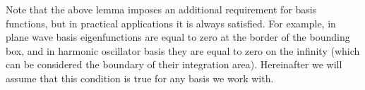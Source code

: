 Note that the above lemma imposes an additional requirement for basis functions, but in practical applications it is always satisfied.
For example, in plane wave basis eigenfunctions are equal to zero at the border of the bounding box, and in harmonic oscillator basis they are equal to zero on the infinity (which can be considered the boundary of their integration area).
Hereinafter we will assume that this condition is true for any basis we work with.
